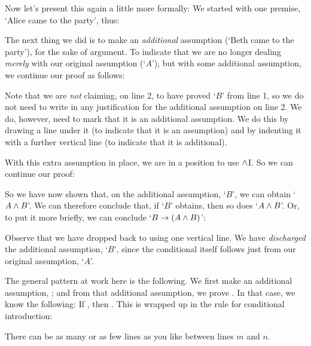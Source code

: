 Now let's present this again a little more formally: We started with one premise, `Alice came to the party', thus:
	\begin{fitchproof}
	\end{fitchproof}
The next thing we did is to make an \emph{additional} assumption (`Beth came to the party'), for the sake of argument. To indicate that we are no longer dealing \emph{merely} with our original assumption (`$A$'), but with some additional assumption, we continue our proof as follows:
	\begin{fitchproof}
	\hypo{r}{A}
		\open
			\hypo{l}{B}
	\end{fitchproof}
Note that we are \emph{not} claiming, on line 2, to have proved `$B$' from line 1, so we do not need to write in any justification for the additional assumption on line 2. We do, however, need to mark that it is an additional assumption. We do this by drawing a line under it (to indicate that it is an assumption) and by indenting it with a further vertical line (to indicate that it is additional).

With this extra assumption in place, we are in a position to use $\mathbin{\wedge}$I. So we can continue our proof:
	\begin{fitchproof}
		\open
			\andI{r, l}
	\end{fitchproof}
So we have now shown that, on the additional assumption, `$B$', we can obtain `$A \mathbin{\wedge} B$'. We can therefore conclude that, if `$B$' obtains, then so does `$A \mathbin{\wedge} B$'. Or, to put it more briefly, we can conclude `$B \rightarrow (A \mathbin{\wedge} B)$':
	\begin{fitchproof}
		\hypo{r}{A}
		\open
			\hypo{l}{B}
			\andI{r, l}
			\close
		\ifI{l-rl}
	\end{fitchproof}
Observe that we have dropped back to using one vertical line.  We have \emph{discharged} the additional assumption, `$B$', since the conditional itself follows just from our original assumption, `$A$'.

The general pattern at work here is the following. We first make an additional assumption, \metaX; and from that additional assumption, we prove \metaY. In that case, we know the following: If \metaX, then \metaY. This is wrapped up in the rule for conditional introduction:
\begin{highlighted}
	\begin{fitchproof}
	\open
		\hypo[m]{a}{\metaX}
		\ellipsesline
		\have[n]{b}{\metaY}
	\close
	\ifI{a-b}
	\end{fitchproof}\end{highlighted}
There can be as many or as few lines as you like between lines $m$ and $n$.

